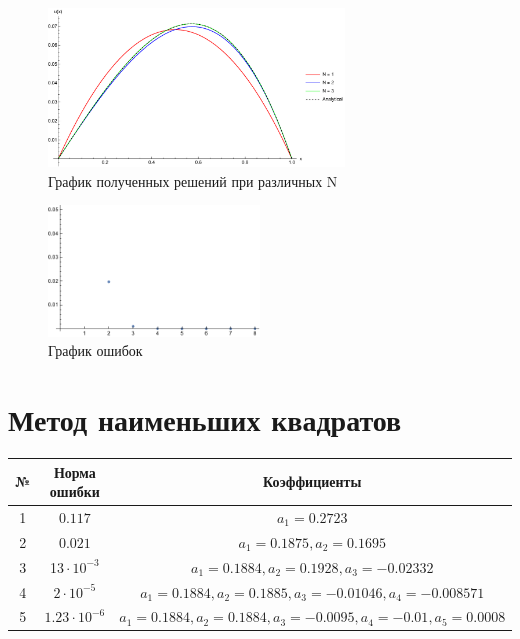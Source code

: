 \documentclass[12pt,a4paper]{article}
\begin{document}
    \begin{figure}[h]
        \centering
        \includegraphics[width=0.7\textwidth]{4.pdf}
        \caption{График полученных решений при различных N}
    \end{figure}
    \begin{figure}[h]
        \centering
        \includegraphics[width=0.5\textwidth]{4_error.pdf}
        \caption{График ошибок}
    \end{figure}

    \pagebreak

    \section{Метод наименьших квадратов}

    \begin{center}
        \begin{tabular}{|c|c|c|} 
         \hline
         № & Норма ошибки & Коэффициенты \\ 
         \hline
         1 & $0.117$ & $a_1=0.2723$ \\ 
         \hline
         2 & $0.021$ & $a_1=0.1875, a_2=0.1695$ \\ 
         \hline
         3 & 1$3\cdot10^{-3}$ & $a_1=0.1884, a_2=0.1928, a_3=-0.02332$ \\ 
         \hline
         4 & $2\cdot10^{-5}$ & $a_1=0.1884, a_2=0.1885, a_3=-0.01046, a_4=-0.008571$ \\ 
         \hline
         5 & $1.23\cdot10^{-6}$ & $a_1=0.1884, a_2=0.1884, a_3=-0.0095, a_4=-0.01, a_5=0.0008$ \\ 
         \hline
        \end{tabular}
    \end{center}
\end{document}
